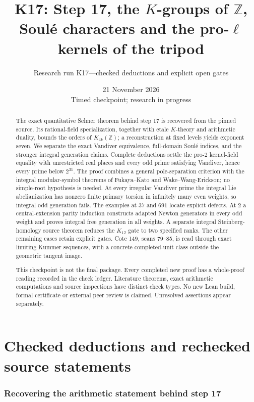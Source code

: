 \documentclass[11pt,a4paper]{article}
\title{K17: Step 17, the $K$-groups of $\mathbb Z$,\\
Soul\'e characters and the pro-$\ell$ kernels of the tripod}
\author{Research run K17---checked deductions and explicit open gates}
\date{21 November 2026\\Timed checkpoint; research in progress}
\theoremstyle{definition}
\begin{document}
\maketitle
\begin{abstract}
The exact quantitative Selmer theorem behind step 17 is recovered from
the pinned source. Its rational-field specialization, together with
etale $K$-theory and arithmetic duality, bounds the orders of
$K_{4k}(\mathbb Z)$; a reconstruction at fixed levels yields exponent
seven. We separate the exact Vandiver equivalence, full-domain Soul\'e
indices, and the stronger integral generation claims. Complete
deductions settle the pro-$2$ kernel-field equality with unrestricted
real places and every odd prime satisfying Vandiver, hence every
prime below $2^{31}$. The proof combines a general pole-separation
criterion with the integral modular-symbol theorems of Fukaya--Kato
and Wake--Wang-Erickson; no simple-root hypothesis is needed. At every
irregular Vandiver prime the integral Lie abelianization has nonzero
finite primary torsion in infinitely many even weights, so integral odd
generation fails. The examples at $37$ and $691$ locate explicit defects.
At $2$ a central-extension
parity induction constructs adapted Newton generators in every odd
weight and proves integral free generation in all weights. A separate
integral Steinberg-homology source theorem reduces the $K_{12}$ gate to
two specified ranks. The other remaining cases retain explicit gates. Cote 149, scans
79--85, is read through exact limiting Kummer sequences, with a concrete
completed-unit class outside the geometric tangent image.

This checkpoint is not the final package. Every completed new proof
has a whole-proof reading recorded in the check ledger. Literature
theorems, exact arithmetic computations and source inspections have
distinct check types. No new Lean build, formal certificate or external
peer review is claimed. Unresolved assertions appear separately.
\end{abstract}
\tableofcontents
\clearpage
\part{Checked deductions and rechecked source statements}

\section{Recovering the arithmetic statement behind step 17}
\label{sec:step17}
\end{document}
